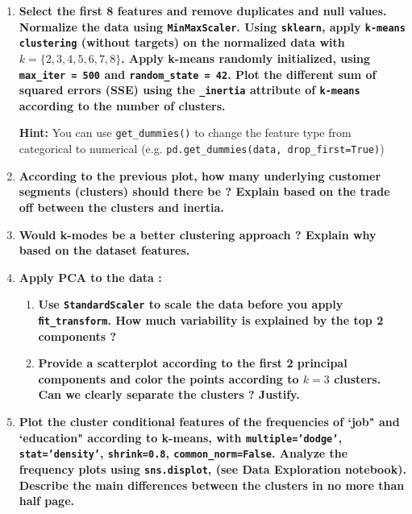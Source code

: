 \documentclass[12pt]{article}
\begin{document}
\begin{enumerate}
    \item \textbf{Select the first 8 features and remove duplicates and null values. Normalize the data
    using \texttt{MinMaxScaler}. Using \texttt{sklearn}, apply \texttt{k-means clustering} (without targets) on the
    normalized data with \( k = \{2,3,4,5,6,7,8\} \). Apply k-means randomly initialized, using \texttt{max\_iter = 500}
    and \texttt{random\_state = 42}. Plot the different sum of squared errors (SSE) using the
    \texttt{\_inertia} attribute of \texttt{k-means} according to the number of clusters.}
    
    \textbf{Hint:} You can use \texttt{get\_dummies()} to change the feature type from categorical to numerical
    (e.g. \texttt{pd.get\_dummies(data, drop\_first=True)})

    \item \textbf{According to the previous plot, how many underlying customer segments (clusters)
    should there be ? Explain based on the trade off between the clusters and inertia.}

    \item \textbf{Would k-modes be a better clustering approach ? Explain why based on the dataset
    features.}

    \item \textbf{Apply PCA to the data :}
    
    \begin{enumerate}[label=\alph*)]
        \item \textbf{Use \texttt{StandardScaler} to scale the data before you apply \texttt{ﬁt\_transform}. How much
        variability is explained by the top 2 components ?}
        \item \textbf{Provide a scatterplot according to the ﬁrst 2 principal components and color the
        points according to $k=3$ clusters. Can we clearly separate the clusters ? Justify.}
    \end{enumerate}
    
    \item \textbf{Plot the cluster conditional features of the frequencies of `job" and `education"
    according to k-means, with \texttt{multiple='dodge'}, \texttt{stat='density'}, \texttt{shrink=0.8},
    \texttt{common\_norm=False}. Analyze the frequency plots using \texttt{sns.displot}, (see Data Exploration
    notebook). Describe the main diﬀerences between the clusters in no more than half page.}








\end{enumerate}
\end{document}
